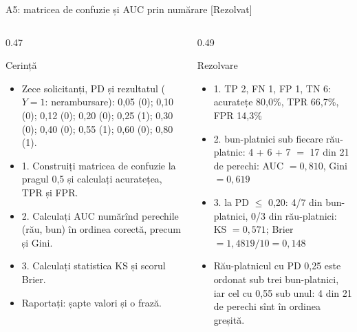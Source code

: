 \begin{frame}{A5: matricea de confuzie și AUC prin numărare [Rezolvat]}
\itemsize{\scriptsize}
\begin{columns}[T]
\begin{column}{0.47\textwidth}
\begin{block}{Cerință}
\begin{itemize}
    \item Zece solicitanți, PD și rezultatul ($Y = 1$: nerambursare): 0,05 (0); 0,10 (0); 0,12 (0); 0,20 (0); 0,25 (1); 0,30 (0); 0,40 (0); 0,55 (1); 0,60 (0); 0,80 (1).
    \item 1. Construiți matricea de confuzie la pragul 0,5 și calculați acuratețea, TPR și FPR.
    \item 2. Calculați AUC numărînd perechile (rău, bun) în ordinea corectă, precum și Gini.
    \item 3. Calculați statistica KS și scorul Brier.
    \item Raportați: șapte valori și o frază.
\end{itemize}
\end{block}
\end{column}
\begin{column}{0.49\textwidth}
\begin{exampleblock}{Rezolvare}
\begin{itemize}
    \item 1. TP 2, FN 1, FP 1, TN 6: acuratețe 80{,}0\%, TPR 66{,}7\%, FPR 14{,}3\%
    \item 2. bun-platnici sub fiecare rău-platnic: 4 + 6 + 7 $=$ 17 din 21 de perechi: AUC $= 0{,}810$, Gini $= 0{,}619$
    \item 3. la PD $\le$ 0{,}20: 4/7 din bun-platnici, 0/3 din rău-platnici: KS $= 0{,}571$; Brier $= 1{,}4819/10 = 0{,}148$
    \item Rău-platnicul cu PD 0,25 este ordonat sub trei bun-platnici, iar cel cu 0,55 sub unul: 4 din 21 de perechi sînt în ordinea greșită.
\end{itemize}
\end{exampleblock}
\end{column}
\end{columns}
\end{frame}

